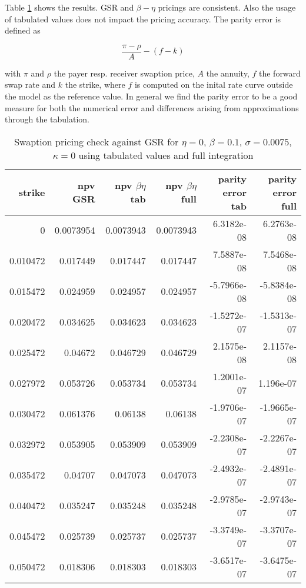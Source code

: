 \documentclass{amsart}
\theoremstyle{plain}
\numberwithin{equation}{section}
\begin{document}
Table \ref{hwcase} shows the results. GSR and $\beta-\eta$ pricings are consistent. Also the usage of tabulated values does not impact the pricing accuracy. The parity error is defined as

\begin{equation}
\frac{\pi - \rho}{A} - (f-k)
\end{equation}

with $\pi$ and $\rho$ the payer resp. receiver swaption price, $A$ the annuity, $f$ the forward swap rate and $k$ the strike, where $f$ is computed on the inital rate curve outside the model as the reference value. In general we find the parity error to be a good measure for both the numerical error and differences arising from approximations through the tabulation.

\begin{table}[ht]
\caption{Swaption pricing check against GSR for $\eta=0$, $\beta=0.1$, $\sigma=0.0075$, $\kappa=0$ using tabulated values and full integration}
\begin{tabular}{r | r | r | r | r | r}
strike & npv GSR & npv $\beta\eta$ tab & npv $\beta\eta$ full & parity error tab & parity error full \\ \hline
0 & 0.0073954 & 0.0073943 & 0.0073943 & 6.3182e-08 & 6.2763e-08 \\ \hline
0.010472 & 0.017449 & 0.017447 & 0.017447 & 7.5887e-08 & 7.5468e-08 \\ 
0.015472 & 0.024959 & 0.024957 & 0.024957 & -5.7966e-08 & -5.8384e-08 \\
0.020472 & 0.034625 & 0.034623 & 0.034623 & -1.5272e-07 & -1.5313e-07 \\
0.025472 & 0.04672 & 0.046729 & 0.046729 & 2.1575e-08 & 2.1157e-08 \\
0.027972 & 0.053726 & 0.053734 & 0.053734 & 1.2001e-07 & 1.196e-07 \\ \hline
0.030472 & 0.061376 & 0.06138 & 0.06138 & -1.9706e-07 & -1.9665e-07 \\ \hline
0.032972 & 0.053905 & 0.053909 & 0.053909 & -2.2308e-07 & -2.2267e-07 \\
0.035472 & 0.04707 & 0.047073 & 0.047073 & -2.4932e-07 & -2.4891e-07 \\
0.040472 & 0.035247 & 0.035248 & 0.035248 & -2.9785e-07 & -2.9743e-07 \\
0.045472 & 0.025739 & 0.025737 & 0.025737 & -3.3749e-07 & -3.3707e-07 \\
0.050472 & 0.018306 & 0.018303 & 0.018303 & -3.6517e-07 & -3.6475e-07
\end{tabular}
\label{hwcase}
\end{table}
\end{document}
